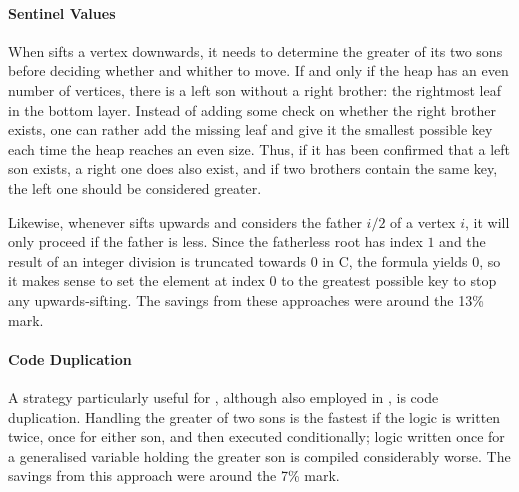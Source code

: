 \paragraph{Sentinel Values}
When \HS{} sifts a vertex downwards, it needs to determine the greater of its two sons before deciding whether and whither to move.
If and only if the heap has an even number of vertices, there is a left son without a right brother:
the rightmost leaf in the bottom layer.
Instead of adding some check on whether the right brother exists, one can rather add the missing leaf and give it the smallest possible key each time the heap reaches an even size.
Thus, if it has been confirmed that a left son exists, a right one does also exist, and if two brothers contain the same key, the left one should be considered greater.

Likewise, whenever \HS{} sifts upwards and considers the father \(i/2\) of a vertex \(i\), it will only proceed if the father is less.
Since the fatherless root has index \(1\) and the result of an integer division is truncated towards \(0\) in C, the formula yields \(0\), so it makes sense to set the element at index \(0\) to the greatest possible key to stop any upwards-sifting.
The savings from these approaches were around the 13\% mark.

\paragraph{Code Duplication}
A strategy particularly useful for \HS{}, although also employed in \MS{}, is code duplication.
Handling the greater of two sons is the fastest if the logic is written twice, once for either son, and then executed conditionally;
logic written once for a generalised variable holding the greater son is compiled considerably worse.
The savings from this approach were around the 7\% mark.





